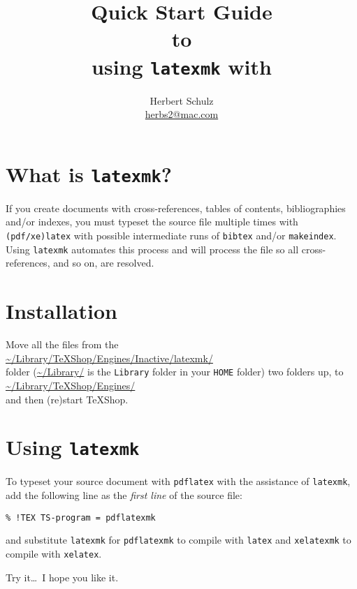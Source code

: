 \documentclass[11pt]{article}
\title{Quick Start Guide\\ to\\using \texttt{latexmk} with \TS}
\author{Herbert Schulz\\\small\href{mailto:herbs2@mac.com}{herbs2@mac.com}}
\date{}
\newcommand{\TS}{\textsf{\TeX Shop}}
\begin{document}
\maketitle
\thispagestyle{empty}

\section*{What is \texttt{latexmk}?}

If you create documents with cross-references, tables of contents, bibliographies and/or indexes, you must typeset the source file multiple times with \texttt{(pdf/xe)latex} with possible intermediate runs of \texttt{bibtex} and/or \texttt{makeindex}. Using \texttt{latexmk} automates this process and will process the file so all cross-references, and so on, are resolved.

\section*{Installation}

Move all the files from the \\
\url{~/Library/TeXShop/Engines/Inactive/latexmk/}\\ folder (\url{~/Library/} is the \texttt{Library} folder in your \texttt{HOME} folder) two folders up, to 
\\\url{~/Library/TeXShop/Engines/}\\ 
and then (re)start \TS.

\section*{Using \texttt{latexmk}}

To typeset your source document with \texttt{pdflatex} with the assistance of 
\texttt{latexmk}, add the following line as the \emph{first line} of the source file:
\begin{verbatim}
% !TEX TS-program = pdflatexmk
\end{verbatim}
and substitute \texttt{latexmk} for \texttt{pdflatexmk} to compile with \texttt{latex} and \texttt{xelatexmk} to compile with \texttt{xelatex}.

\vspace{5pt plus 2pt minus 1pt}\noindent
Try it\dots\ I hope you like it.
\end{document}
